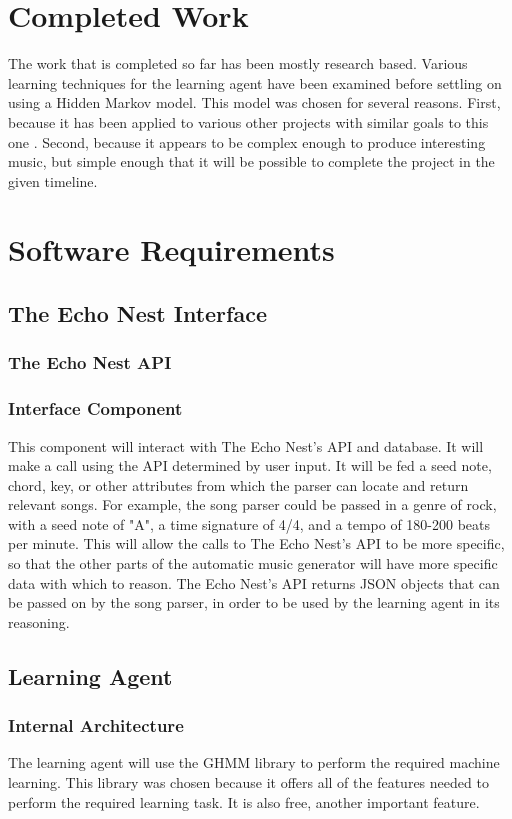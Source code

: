 \documentclass{article}
\begin{document}
\section{Completed Work}
The work that is completed so far has been mostly research based. Various learning techniques for the learning agent have been examined before settling on using a Hidden Markov model. This model was chosen for several reasons. First, because it has been applied to various other projects with similar goals to this one \cite{761266, 1394661} . Second, because it appears to be complex enough to produce interesting music, but simple enough that it will be possible to complete the project in the given timeline.\\

\section{Software Requirements}
\subsection{The Echo Nest Interface}
\subsubsection{The Echo Nest API}
\subsubsection{Interface Component}
This component will interact with The Echo Nest's API and database. It will make a call using the API determined by user input. It will be fed a seed note, chord, key, or other attributes from which the parser can locate and return relevant songs. For example, the song parser could be passed in a genre of rock, with a seed note of "A", a time signature of 4/4, and a tempo of 180-200 beats per minute. This will allow the calls to The Echo Nest's API to be more specific, so that the other parts of the automatic music generator will have more specific data with which to reason. The Echo Nest's API returns JSON objects that can be passed on by the song parser, in order to be used by the learning agent in its reasoning.

\subsection{Learning Agent}
\subsubsection{Internal Architecture}
The learning agent will use the GHMM library \cite{GHMM} to perform the required machine learning. This library was chosen because it offers all of the features needed to perform the required learning task. It is also free, another important feature.
\end{document}
